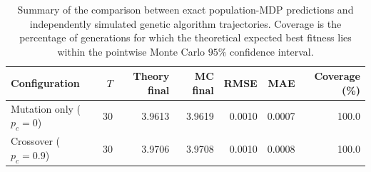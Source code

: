 \begin{table}[t]
    \centering
    \caption{Summary of the comparison between exact population-MDP predictions and independently simulated genetic algorithm trajectories. Coverage is the percentage of generations for which the theoretical expected best fitness lies within the pointwise Monte Carlo $95\%$ confidence interval.}
    \label{tab:combined-ga-trajectory-summary}
    \begin{tabular}{lrrrrrr}
        \hline
        \textbf{Configuration} & \textbf{$T$} & \textbf{Theory final} & \textbf{MC final} & \textbf{RMSE} & \textbf{MAE} & \textbf{Coverage (\%)} \\
        \hline
        Mutation only ($p_c=0$) & 30 & 3.9613 & 3.9619 & 0.0010 & 0.0007 & 100.0 \\
        Crossover ($p_c=0.9$) & 30 & 3.9706 & 3.9708 & 0.0010 & 0.0008 & 100.0 \\
        \hline
    \end{tabular}
\end{table}
